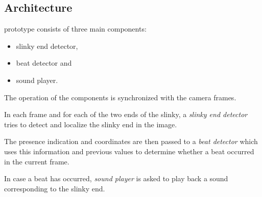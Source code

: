 

\subsection{Architecture}

\slnkcctr{} prototype consists of three main components:

\begin{itemize}
\item slinky end detector,
\item beat detector and
\item sound player.
\end{itemize}

The operation of the components is synchronized with the camera frames.

In each frame and for each of the two ends of the slinky,
a \emph{slinky end detector} tries to detect and localize
the slinky end in the image.

The presence indication and coordinates are then passed to
a \emph{beat detector} which uses this information
and previous values to determine whether
a beat occurred in the current frame.

In case a beat has occurred, \emph{sound player} is asked
to play back a sound corresponding to the slinky end.

